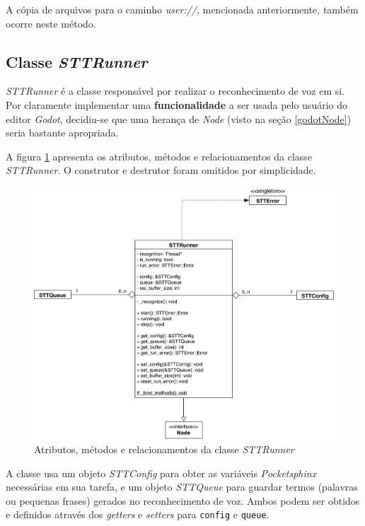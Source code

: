 A cópia de arquivos para o caminho \textit{user://}, mencionada anteriormente, também ocorre neste método.


\subsection{Classe \textit{STTRunner}}

\textit{STTRunner} é a classe responsável por realizar o reconhecimento de voz em si. Por claramente implementar uma \textbf{funcionalidade} a ser usada pelo usuário do editor \textit{Godot}, decidiu-se que uma herança de \textit{Node} (visto na seção \ref{godotNode}) seria bastante apropriada.

A figura \ref{stt-runner-diagram} apresenta os atributos, métodos e relacionamentos da classe \textit{STTRunner}. O construtor e destrutor foram omitidos por simplicidade.

\begin{figure}[H]
  \centering
  \includegraphics[width=.9\textwidth]{image/stt-runner.pdf}
  \caption{Atributos, métodos e relacionamentos da classe \textit{STTRunner}}
  \label{stt-runner-diagram}
\end{figure}

A classe usa um objeto \textit{STTConfig} para obter as variáveis \textit{Pocketsphinx} necessárias em sua tarefa, e um objeto \textit{STTQueue} para guardar termos (palavras ou pequenas frases) gerados no reconhecimento de voz. Ambos podem ser obtidos e definidos através dos \textit{getters} e \textit{setters} para \texttt{config} e \texttt{queue}.

